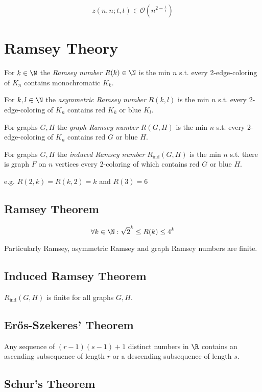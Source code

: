 $$z(n,n;t,t) \in \mathcal{O}(n^{2-\frac{1}{t}})$$

\section*{Ramsey Theory}

For $k \in \N$ the \emph{Ramsey number} $R(k) \in \N$ is the min $n$ s.t. every 2-edge-coloring of $K_n$ contains monochromatic $K_k$.

\spacing

For $k, l \in \N$ the \emph{asymmetric Ramsey number} $R(k,l)$ is the min $n$ s.t. every 2-edge-coloring of $K_n$ contains red $K_k$ or blue $K_l$.

\spacing

For graphs $G, H$ the \emph{graph Ramsey number} $R(G,H)$ is the min $n$ s.t. every 2-edge-coloring of $K_n$ contains red $G$ or blue $H$.

\spacing

For graphs $G, H$ the \emph{induced Ramsey number} $R_\text{ind}(G,H)$ is the min $n$ s.t. there is graph $F$ on $n$ vertices every 2-coloring of which contains red $G$ or blue $H$.

\spacing

e.g. $R(2,k) = R(k,2) = k$ and $R(3) = 6$

\subsection*{Ramsey Theorem}

$$\forall k \in \N : \sqrt{2}^k \leq R(k) \leq 4^k$$

Particularly Ramsey, asymmetric Ramsey and graph Ramsey numbers are finite.

\subsection*{Induced Ramsey Theorem}

$R_\text{ind}(G,H)$ is finite for all graphs $G, H$.

\subsection*{Er\H{o}s-Szekeres' Theorem}

Any sequence of $(r-1)(s-1)+1$ distinct numbers in $\R$ contains an ascending subsequence of length $r$ or a descending subsequence of length $s$.

\subsection*{Schur's Theorem}

